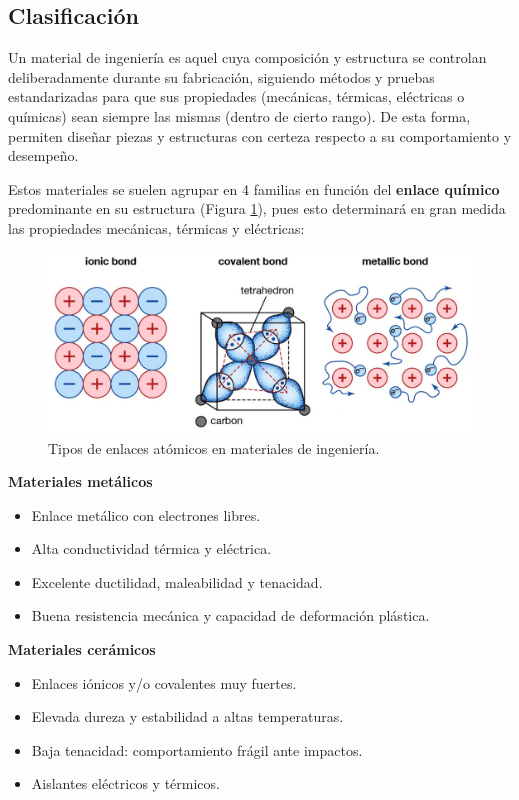 \subsection{Clasificación}

Un material de ingeniería es aquel cuya composición y estructura se controlan deliberadamente durante su fabricación, siguiendo métodos y pruebas estandarizadas para que sus propiedades (mecánicas, térmicas, eléctricas o químicas) sean siempre las mismas (dentro de cierto rango). De esta forma, permiten diseñar piezas y estructuras con certeza respecto a su comportamiento y desempeño.

Estos materiales se suelen agrupar en 4 familias en función del \textbf{enlace químico} predominante en su estructura (Figura \ref{bons}), pues esto determinará en gran medida las propiedades mecánicas, térmicas y eléctricas:

\begin{figure}[h!]
    \centering
    \includegraphics[width=0.75\linewidth]{imgs/bonds.png}
    \caption{Tipos de enlaces atómicos en materiales de ingeniería.}
    \label{bons}
\end{figure}

\textbf{Materiales metálicos}
    \begin{itemize}
      \item Enlace metálico con electrones libres.
      \item Alta conductividad térmica y eléctrica.
      \item Excelente ductilidad, maleabilidad y tenacidad.
      \item Buena resistencia mecánica y capacidad de deformación plástica.
    \end{itemize}

\textbf{Materiales cerámicos}
  
    \begin{itemize}
      \item Enlaces iónicos y/o covalentes muy fuertes.
      \item Elevada dureza y estabilidad a altas temperaturas.
      \item Baja tenacidad: comportamiento frágil ante impactos.
      \item Aislantes eléctricos y térmicos.
    \end{itemize}

